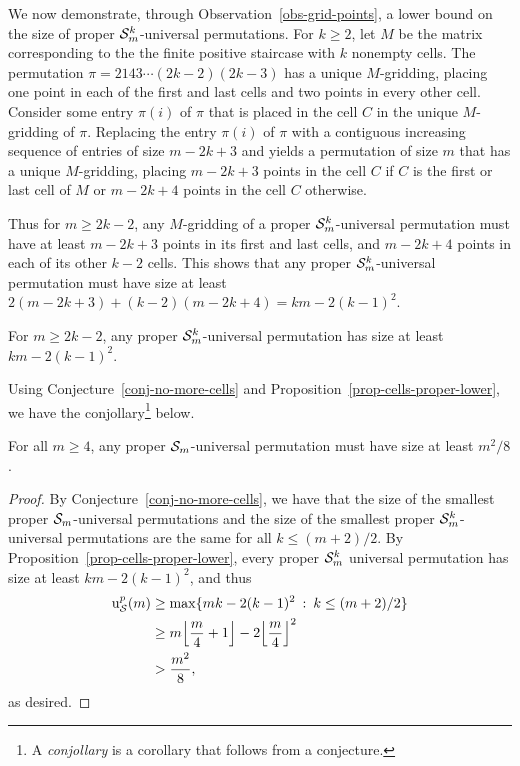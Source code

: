 We now demonstrate, through Observation~\ref{obs-grid-points}, a lower bound on the size of proper $\S^{k}_m$-universal permutations. For $k \ge 2$, let $M$ be the matrix corresponding to the the finite positive staircase with $k$ nonempty cells. The permutation $\pi = 21 43 \cdots (2k-2)(2k-3)$ has a unique $M$-gridding, placing one point in each of the first and last cells and two points in every other cell. Consider some entry $\pi(i)$ of $\pi$ that is placed in the cell $C$ in the unique $M$-gridding of $\pi$. Replacing the entry $\pi(i)$ of $\pi$ with a contiguous increasing sequence of entries of size $m-2k+3$ and yields a permutation of size $m$ that has a unique $M$-gridding, placing $m-2k+3$ points in the cell $C$ if $C$ is the first or last cell of $M$ or $m-2k+4$ points in the cell $C$ otherwise. 

Thus for $m \ge 2k-2$, any $M$-gridding of a proper $\S^k_m$-universal permutation must have at least $m-2k+3$ points in its first and last cells, and $m-2k+4$ points in each of its other $k-2$ cells. This shows that any proper $\S^k_m$-universal permutation must have size at least $2(m-2k+3) + (k-2)(m-2k+4) = km - 2(k-1)^2$.

\begin{proposition}
\label{prop-cells-proper-lower}
	For $m \ge 2k-2$, any proper $\S^k_m$-universal permutation has size at least $km - 2(k-1)^2$.
\end{proposition}

Using Conjecture~\ref{conj-no-more-cells} and Proposition~\ref{prop-cells-proper-lower}, we have the conjollary\footnote{A \emph{conjollary} is a corollary that follows from a conjecture.} below.
\begin{conjollary}
	For all $m \ge 4$, any proper $\S_m$-universal permutation must have size at least $m^2/8$.
\end{conjollary}
\begin{proof}
	By Conjecture~\ref{conj-no-more-cells}, we have that the size of the smallest proper $\S_m$-universal permutations and the size of the smallest proper $\S^k_m$-universal permutations are the same for all $k \le (m+2)/2$. By Proposition~\ref{prop-cells-proper-lower}, every proper $\S^k_m$ universal permutation has size at least $km - 2(k-1)^2$, and thus
	\begin{align*}
		\u_{\S}^p(m) 
			&\ge \max\{mk - 2(k-1)^2 \st k \le (m+2)/2\} \\
			&\ge m \floor{\frac{m}{4}+1} - 2 \floor{\frac{m}{4}}^2 \\
			&> \frac{m^2}{8},
	\end{align*}
	as desired.
\end{proof}

